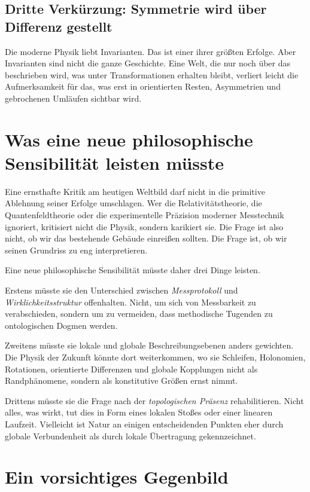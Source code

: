 \documentclass[11pt,a4paper]{article}
\theoremstyle{remark}
\begin{document}
	\subsection*{Dritte Verkürzung: Symmetrie wird über Differenz gestellt}
	
	Die moderne Physik liebt Invarianten. Das ist einer ihrer größten Erfolge. Aber Invarianten sind nicht die ganze Geschichte. Eine Welt, die nur noch über das beschrieben wird, was unter Transformationen erhalten bleibt, verliert leicht die Aufmerksamkeit für das, was erst in orientierten Resten, Asymmetrien und gebrochenen Umläufen sichtbar wird.
	
	\section{Was eine neue philosophische Sensibilität leisten müsste}
	
	Eine ernsthafte Kritik am heutigen Weltbild darf nicht in die primitive Ablehnung seiner Erfolge umschlagen. Wer die Relativitätstheorie, die Quantenfeldtheorie oder die experimentelle Präzision moderner Messtechnik ignoriert, kritisiert nicht die Physik, sondern karikiert sie. Die Frage ist also nicht, ob wir das bestehende Gebäude einreißen sollten. Die Frage ist, ob wir seinen Grundriss zu eng interpretieren.
	
	Eine neue philosophische Sensibilität müsste daher drei Dinge leisten.
	
	Erstens müsste sie den Unterschied zwischen \emph{Messprotokoll} und \emph{Wirklichkeitsstruktur} offenhalten. Nicht, um sich von Messbarkeit zu verabschieden, sondern um zu vermeiden, dass methodische Tugenden zu ontologischen Dogmen werden.
	
	Zweitens müsste sie lokale und globale Beschreibungsebenen anders gewichten. Die Physik der Zukunft könnte dort weiterkommen, wo sie Schleifen, Holonomien, Rotationen, orientierte Differenzen und globale Kopplungen nicht als Randphänomene, sondern als konstitutive Größen ernst nimmt.
	
	Drittens müsste sie die Frage nach der \emph{topologischen Präsenz} rehabilitieren. Nicht alles, was wirkt, tut dies in Form eines lokalen Stoßes oder einer linearen Laufzeit. Vielleicht ist Natur an einigen entscheidenden Punkten eher durch globale Verbundenheit als durch lokale Übertragung gekennzeichnet.
	
	\section{Ein vorsichtiges Gegenbild}
	
\end{document}
